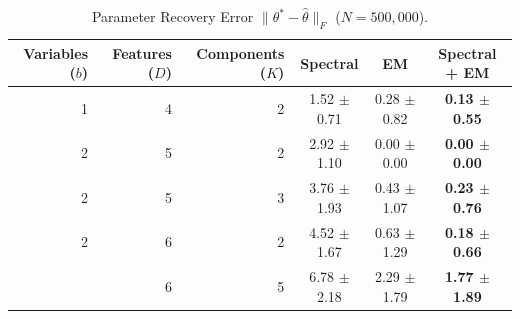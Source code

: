 \begin{table}[t]
\caption{Parameter Recovery Error $\|\theta^* - \hat \theta\|_F$ ($N = 500,000$).}
\label{tbl:parameter-recovery}
\vskip 0.15in
\begin{center}
\begin{small}
\begin{sc}

  \begin{tabular}{ r r r c c c }
\hline
\abovespace\belowspace
Variables ($b$) & Features ($D$) & Components ($K$) & Spectral & EM & Spectral + EM \\
\hline
\abovespace
  1 & 4 & 2 & 1.52 $\pm$ 0.71 & 0.28 $\pm$ 0.82 & {\bf 0.13 $\pm$ 0.55} \\
  2 & 5 & 2 & 2.92 $\pm$ 1.10 & 0.00 $\pm$ 0.00 & {\bf 0.00 $\pm$ 0.00} \\
  2 & 5 & 3 & 3.76 $\pm$ 1.93 & 0.43 $\pm$ 1.07 & {\bf 0.23 $\pm$ 0.76} \\
  2 & 6 & 2 & 4.52 $\pm$ 1.67 & 0.63 $\pm$ 1.29 & {\bf 0.18 $\pm$ 0.66} \\
\belowspace
  2 & 6 & 5 & 6.78 $\pm$ 2.18 & 2.29 $\pm$ 1.79 & {\bf 1.77 $\pm$ 1.89} \\


\hline

\end{tabular}
\end{sc}
\end{small}
\end{center}
\vskip -0.1in
\end{table}

